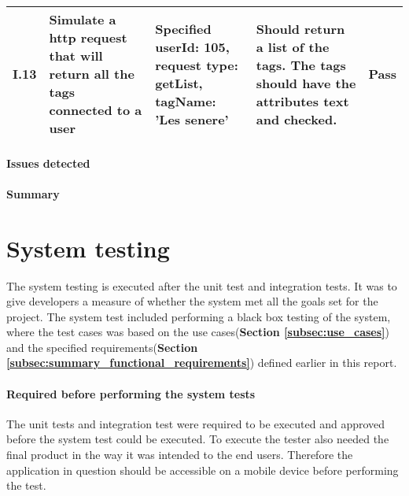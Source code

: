 {\begin{center}
\begin{longtable}{ | p{1cm} | p{5.5cm} | p{4cm} | p{4.5cm} | p{2cm}|}
					
			I.13 & Simulate a http request that will return all the tags connected to a user  & Specified userId: 105, \newline request type: getList, \newline tagName: 'Les senere' & Should return a list of the tags. The tags should have the attributes text and checked. & Pass\\ \hline	

\end{longtable}
\end{center}

\paragraph{Issues detected}

\paragraph{Summary}


\section{System testing}

The system testing is executed after the unit test and integration tests. It was to give developers a measure of whether the system met all the goals set for the project.  The system test included performing a black box testing of the system, where the test cases was based on the use cases(\textbf{Section \ref{subsec:use_cases}}) and the specified requirements(\textbf{Section \ref{subsec:summary_functional_requirements}})  defined earlier in this report. \newline

\paragraph{Required before performing the system tests}
The unit tests and integration test were required to be executed and approved before the system test could be executed. To execute the tester also needed the final product in the way it was intended to the end users. Therefore the application in question should be accessible on a mobile device before performing the test. \newline

}
